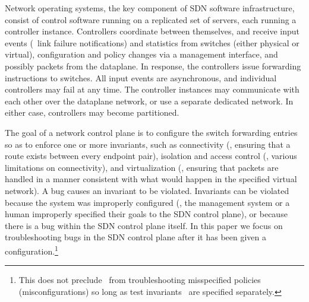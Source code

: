 %
Network operating systems, the key component of SDN software
infrastructure, consist of control software running on a replicated set of
servers, each running a controller instance. Controllers coordinate between
themselves, and receive input events (\eg~link failure notifications) and
statistics from switches (either physical or virtual), configuration and
policy changes via a management interface, and possibly packets from the dataplane.
In response, the
controllers issue forwarding instructions to switches. All input
events are asynchronous, and individual controllers may fail at any
time. The controller instances may communicate
with each other over the dataplane network, or use a separate dedicated
network. In either case, controllers may become partitioned.

The goal of a network control plane is to configure the switch forwarding entries so as to
enforce one or more invariants, such as connectivity (\ie, ensuring that a
route exists between every endpoint pair), isolation and access control (\ie, various limitations on
connectivity), and virtualization (\ie, ensuring that packets are handled
in a manner consistent with what would happen in the specified virtual
network). A bug causes an invariant to be violated. Invariants can be
violated because the system was improperly configured
(\eg, the management system \cite{quantum} or a human improperly specified their goals to the SDN control plane), or
because there is a bug within the SDN control plane itself. In this paper we focus on troubleshooting bugs in the
SDN control plane after it has been given a configuration.\footnote{This does
not preclude \projectname~from troubleshooting misspecified policies
(misconfigurations) so long as
test invariants~\cite{hsa} are specified separately.}

